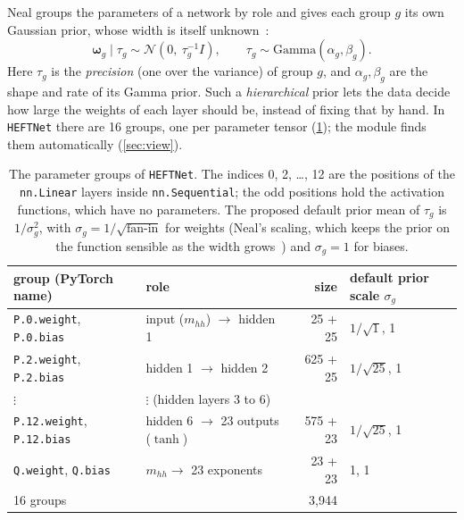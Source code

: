 \documentclass[11pt]{article}
\newcommand{\code}[1]{\texttt{#1}}
\newcommand{\mhh}{m_{hh}}
\newcommand{\bw}{\boldsymbol{\omega}}
\begin{document}
Neal groups the parameters of a network by role and gives each group $g$ its own
Gaussian prior, whose width is itself unknown~\cite[ch.~2 and 3]{neal1996}:
\begin{equation}
  \bw_g \mid \tau_g \sim \mathcal{N}\!\left(0,\ \tau_g^{-1} I\right), \qquad
  \tau_g \sim \text{Gamma}(\alpha_g, \beta_g).
  \label{eq:prior}
\end{equation}
Here $\tau_g$ is the \emph{precision} (one over the variance) of group $g$, and
$\alpha_g, \beta_g$ are the shape and rate of its Gamma prior. Such a
\emph{hierarchical} prior lets the data decide how large the weights of each layer
should be, instead of fixing that by hand. In \code{HEFTNet} there are 16 groups,
one per parameter tensor (\cref{tab:groups}); the module finds them automatically
(\cref{sec:view}).

\begin{table}[h]
\centering\small
\begin{tabular}{llrl}
\toprule
group (PyTorch name) & role & size & default prior scale $\sigma_g$\\
\midrule
\code{P.0.weight}, \code{P.0.bias} & input ($\mhh$) $\to$ hidden 1 & 25 + 25 & $1/\sqrt{1}$, 1\\
\code{P.2.weight}, \code{P.2.bias} & hidden 1 $\to$ hidden 2 & 625 + 25 & $1/\sqrt{25}$, 1\\
\quad$\vdots$ & \quad$\vdots$ (hidden layers 3 to 6) & & \\
\code{P.12.weight}, \code{P.12.bias} & hidden 6 $\to$ 23 outputs ($\tanh$) & 575 + 23 & $1/\sqrt{25}$, 1\\
\code{Q.weight}, \code{Q.bias} & $\mhh \to$ 23 exponents & 23 + 23 & 1, 1\\
\midrule
16 groups & & 3,944 & \\
\bottomrule
\end{tabular}
\caption{The parameter groups of \code{HEFTNet}. The indices 0, 2, \ldots, 12 are
the positions of the \code{nn.Linear} layers inside \code{nn.Sequential}; the odd
positions hold the activation functions, which have no parameters. The proposed
default prior mean of $\tau_g$ is $1/\sigma_g^2$, with $\sigma_g = 1/\sqrt{\text{fan-in}}$
for weights (Neal's scaling, which keeps the prior on the function sensible as the
width grows~\cite[ch.~2]{neal1996}) and $\sigma_g = 1$ for biases.}
\label{tab:groups}
\end{table}
\end{document}
